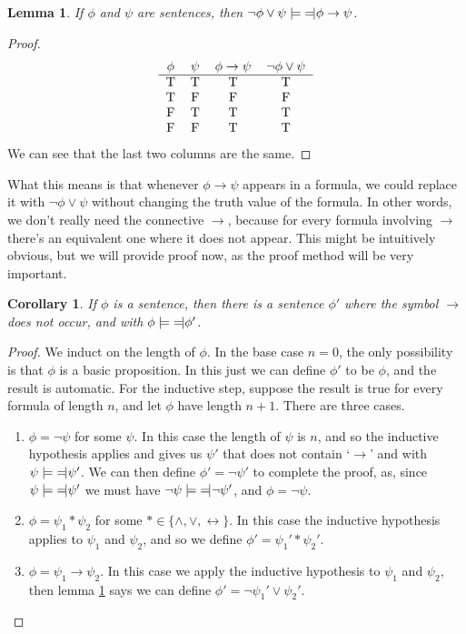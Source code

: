 \documentclass{article}
\theoremstyle{plain}
\newtheorem{lemma}[theorem]{Lemma}{\bfseries}{\upshape}
\newtheorem{corollary}[theorem]{Corollary}{\bfseries}{\upshape}
\newcommand{\lequiv}{\models\text{\reflectbox{$\models$}}}
\newcommand{\ra}{\rightarrow}
\begin{document}
\begin{lemma}\label{L:imp}
If $\phi$ and $\psi$ are sentences, then $\neg\phi \vee \psi \lequiv \phi\rightarrow \psi$.
\end{lemma}
\begin{proof}\mbox{}
\[\begin{tabular}{ c c c c }
 $\phi$ & $\psi$ & $\phi\rightarrow \psi$ & $\neg\phi\vee\psi$ \\ \hline 
 T & T & T & T \\  
 T & F & F & F \\
 F & T & T & T \\
 F & F & T & T   
\end{tabular}\]
\newline
We can see that the last two columns are the same. 
\end{proof}
What this means is that whenever $\phi\ra \psi$ appears in a formula, we could replace it with $\neg\phi\vee\psi$ without changing the truth value of the formula. In other words, we don't really need the connective $\ra$, because for every formula involving $\ra$ there's an equivalent one where it does not appear. This might be intuitively obvious, but we will provide proof now, as the proof method will be very important.
\begin{corollary}\label{C:imp}
If $\phi$ is a sentence, then there is a sentence $\phi'$ where the symbol $\rightarrow$ does not occur, and with $\phi\lequiv \phi'$.
\end{corollary}
\begin{proof}
We induct on the length of $\phi$. In the base case $n=0$, the only possibility is that $\phi$ is a basic proposition. In this just we can define $\phi'$ to be $\phi$, and the result is automatic. For the inductive step, suppose the result is true for every formula of length $n$, and let $\phi$ have length $n+1$. There are three cases.
\begin{enumerate}
\item $\phi = \neg \psi$ for some $\psi$. In this case the length of $\psi$ is $n$, and so the inductive hypothesis applies and gives us $\psi'$ that does not contain `$\rightarrow$' and with $\psi\lequiv \psi'$. We can then define $\phi'=\neg\psi'$ to complete the proof, as, since $\psi\lequiv \psi'$ we must have $\neg\psi\lequiv \neg\psi'$, and $\phi=\neg\psi$.
\item $\phi = \psi_1*\psi_2$ for some $*\in\{\wedge,\vee,\leftrightarrow\}$. In this case the inductive hypothesis applies to $\psi_1$ and $\psi_2$, and so we define $\phi'=\psi_1'*\psi_2'$.
\item $\phi = \psi_1\rightarrow \psi_2$. In this case we apply the inductive hypothesis to $\psi_1$ and $\psi_2$, then lemma \ref{L:imp} says we can define $\phi'=\neg\psi_1'\vee \psi_2'$.
\end{enumerate}   
\end{proof}
\end{document}
